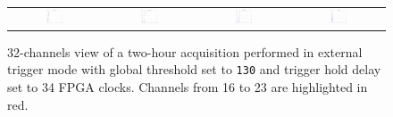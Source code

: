 \begin{figure}[hbt!]
\begin{tabular}{cccc}
        \includegraphics[width=0.204\textwidth]{Images/chap3/results/muons/ch_ext_trigger/incoming_energy_32channels_34_2hr_28.pdf} & \includegraphics[width=0.204\textwidth]{Images/chap3/results/muons/ch_ext_trigger/incoming_energy_32channels_34_2hr_29.pdf} & \includegraphics[width=0.204\textwidth]{Images/chap3/results/muons/ch_ext_trigger/incoming_energy_32channels_34_2hr_30.pdf} & \includegraphics[width=0.204\textwidth]{Images/chap3/results/muons/ch_ext_trigger/incoming_energy_32channels_34_2hr_31.pdf}\\
    \end{tabular}
    \caption{32-channels view of a two-hour acquisition performed in external trigger mode with global threshold set to \texttt{130} and trigger hold delay set to 34 FPGA clocks. Channels from 16 to 23 are highlighted in red.}
    \label{figMUON32channels}
\end{figure}
\FloatBarrier 